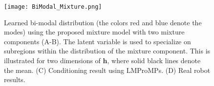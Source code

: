 \begin{figure}%
\begin{center}
\texttt{[image: BiModal\_Mixture.png]}
\end{center}
\caption{Learned bi-modal distribution (the colors red and blue denote the modes) using the proposed mixture model with two mixture components (A-B). 
The latent variable is used to specialize on subregions within the distribution of the mixture component. 
This is illustrated for two dimensions of $\textbf{h}$, where solid black lines denote the mean. 
(C) Conditioning result using LMProMPs. (D) Real robot results.
\label{fig:bimodal_mixture}}
\end{figure}
  

